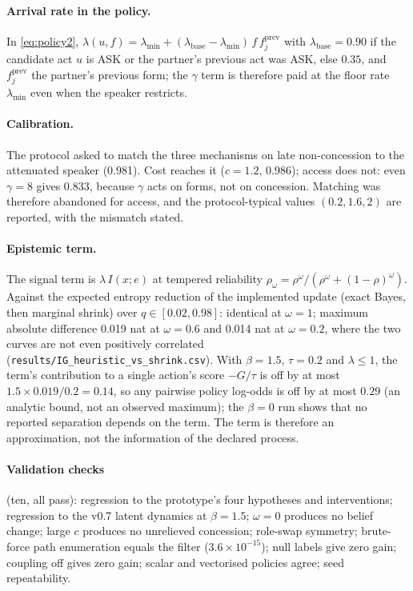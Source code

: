 \documentclass[runningheads]{llncs}
\begin{document}
\paragraph{Arrival rate in the policy.} In \eqref{eq:policy2}, $\lambda(u,f)=\lambda_{\min}+(\lambda_{\mathrm{base}}-\lambda_{\min})\,f\,f^{\mathrm{prev}}_{j}$ with $\lambda_{\mathrm{base}}=0.90$ if the candidate act $u$ is ASK or the partner's previous act was ASK, else $0.35$, and $f^{\mathrm{prev}}_j$ the partner's previous form; the $\gamma$ term is therefore paid at the floor rate $\lambda_{\min}$ even when the speaker restricts.
\paragraph{Calibration.} The protocol asked to match the three mechanisms on late non-concession to the attenuated speaker (0.981). Cost reaches it ($c=1.2$, 0.986); access does not: even $\gamma=8$ gives 0.833, because $\gamma$ acts on forms, not on concession. Matching was therefore abandoned for access, and the protocol-typical values $(0.2,1.6,2)$ are reported, with the mismatch stated.
\paragraph{Epistemic term.} The signal term is $\lambda\,I(x;e)$ at tempered reliability $\rho_\omega=\rho^\omega/(\rho^\omega+(1-\rho)^\omega)$. Against the expected entropy reduction of the implemented update (exact Bayes, then marginal shrink) over $q\in[0.02,0.98]$: identical at $\omega=1$; maximum absolute difference 0.019 nat at $\omega=0.6$ and 0.014 nat at $\omega=0.2$, where the two curves are not even positively correlated (\texttt{results/IG\_heuristic\_vs\_shrink\allowbreak.csv}). With $\beta=1.5$, $\tau=0.2$ and $\lambda\le1$, the term's contribution to a single action's score $-G/\tau$ is off by at most $1.5\times0.019/0.2=0.14$, so any pairwise policy log-odds is off by at most $0.29$ (an analytic bound, not an observed maximum); the $\beta=0$ run shows that no reported separation depends on the term. The term is therefore an approximation, not the information of the declared process.
\paragraph{Validation checks} (ten, all pass): regression to the prototype's four hypotheses and interventions; regression to the v0.7 latent dynamics at $\beta=1.5$; $\omega=0$ produces no belief change; large $c$ produces no unrelieved concession; role-swap symmetry; brute-force path enumeration equals the filter ($3.6\times10^{-15}$); null labels give zero gain; coupling off gives zero gain; scalar and vectorised policies agree; seed repeatability.
\end{document}

